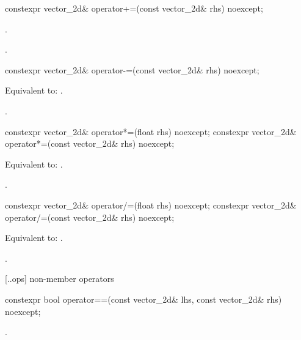 %
\begin{itemdecl}
constexpr vector_2d& operator+=(const vector_2d& rhs) noexcept;
\end{itemdecl}
\begin{itemdescr}
\pnum
\effects
{}.
	
\pnum
\returns
{}.
\end{itemdescr}

%
\begin{itemdecl}
constexpr vector_2d& operator-=(const vector_2d& rhs) noexcept;
\end{itemdecl}
\begin{itemdescr}
\pnum
\effects
Equivalent to: .

\pnum
\returns
{}.
\end{itemdescr}

%
\begin{itemdecl}
constexpr vector_2d& operator*=(float rhs) noexcept;
constexpr vector_2d& operator*=(const vector_2d& rhs) noexcept;
\end{itemdecl}
\begin{itemdescr}
\pnum
\effects
Equivalent to: .

\pnum
\returns
{}.
\end{itemdescr}

%
\begin{itemdecl}
constexpr vector_2d& operator/=(float rhs) noexcept;
constexpr vector_2d& operator/=(const vector_2d& rhs) noexcept;
\end{itemdecl}
\begin{itemdescr}
\pnum
\effects
Equivalent to: .

\pnum
\returns
{}.
\end{itemdescr}

 [\iotwod.\vectortwod.ops] { non-member operators}

%
\begin{itemdecl}
constexpr bool operator==(const vector_2d& lhs, const vector_2d& rhs) noexcept;
\end{itemdecl}
\begin{itemdescr}
\pnum
\returns
{}.
\end{itemdescr}

